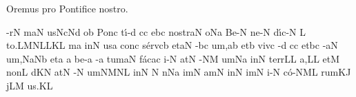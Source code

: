 \beginhymn Oremus pro Pontifice nostro.

\nosolesmescustos
{}
\Internote
\initiumgregorianum
{}%
\sgn {}-r\punctum N\egn
{}m\clivis aN\egn
\sgn {}us\pes Nc\augmentumduplex Nd\egn
\spatium
{}o{}\punctum b\egn
\spatium
\sgn Pon\engl{}\punctum c\egn
\sgn t{\'\i}-\punctum d\egn
{}c\punctum c\egn
\sgn {}e{}\pes bc\egn
\spatium
\sgn no{str}\clivis aN\egn
\sgn {}o{}\pes Na\egn
\spatium
\sgn Be-\punctum N\egn
\sgn ne-\punctum N\egn
\sgn d{\'\i}{c-}\punctum N\egn
\custos L
\lineaproxima
\sgn to.\pes LM\spatiumparvum\clivis NL\spatiumparvum\punctum L\spatiumparvum\punctum K\augmentum L\egn
\spatium
\divisiofinalis
{}m\punctum a\egn
\sgn {}in\punctum N\egn
\sgn {}us\punctum a\egn
\spatium
\sgn con\punctum c\egn
\sgn s{\'e}{rv}\clivis cb\egn
\sgn {}et\clivis aN\egn
\spatium
{}-\pes bc\egn
\sgn {}u{m,}\punctum a\augmentum b\egn
\spatium
\divisiominor
\spatium
\sgn {}et\punctum b\egn
\spatium
\sgn viv\punctum c\egn
\sgn {}{\'\i}-\punctum d\egn
{}c\punctum c\egn
\sgn {}et\pes bc\egn
\spatium
{}-\clivis aN\egn
\sgn {}u{m,}\pes Na\augmentumduplex Nb\egn
\spatium
\divisiominor
\spatium
\sgn {}et\punctum a\egn
\spatium
\custos a
\lineaproxima
\sgn be-\punctum a\egn
{}-\punctum a\egn
\sgn tum\clivis aN\egn
\spatium
\sgn f{\'a}c\pes ac\egn
\sgn {}i-\punctum N\egn
\sgn {}at\punctum N\egn
\spatium
{}-\clivis NM\egn
\sgn {}um\pes Na\egn
\spatium
\sgn {}in\punctum N\egn
\spatium
\sgn t{e}{rr}\punctum L\augmentum L\egn
\sgn {}a,\punctum L\augmentum L\egn
\spatium
\divisiomaior
\spatium
\sgn {}et\punctum M\egn
\spatium
\sgn non\punctum L\egn
\spatium
{}d\pes KN\egn
\sgn {}at\punctum N\egn
\spatium
{}-\punctum N\egn
\sgn {}um\clivis NM\augmentumduplex NL\egn
\spatium
\divisiominor
\spatium
\sgn {}in\punctum N\egn
\spatium
\custos N
\lineaproxima
{}n\pes Na\egn
\sgn {}im\punctum N\egn
\sgn {}am\punctum N\egn
\spatium
\sgn {}in\punctum N\egn
\sgn {}im\punctum N\egn
\sgn {}i-\punctum N\egn
\sgn c{\'o}-\climacus NML\egn
\sgn rum\clivis KJ\egn
\spatium
{}j\pes LM\egn
\sgn {}u{s.}\punctum K\augmentum L\egn
\Finisgregoriana

\bigskip

